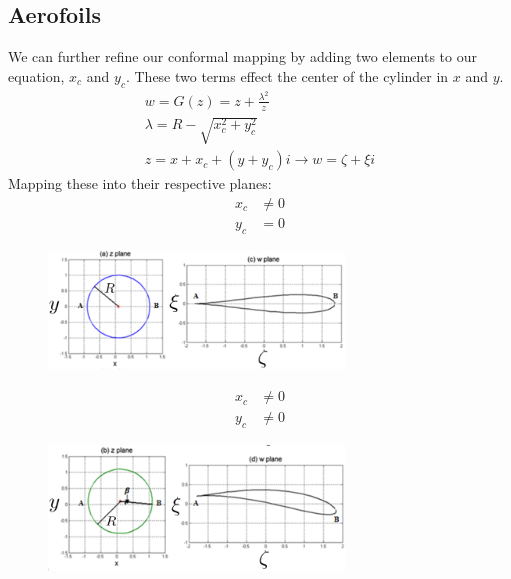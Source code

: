 \documentclass[class=report, crop=false, 12pt,a4paper]{standalone}
\begin{document}
\subsection{Aerofoils}
We can further refine our conformal mapping by adding two elements to our equation, $x_c$ and $y_c$. These two terms effect the center of the cylinder in $x$ and $y$. 
\begin{gather}
  w = G(z) = z + \frac{\lambda^2}{z}\\
  \lambda = R - \sqrt{x_c^2 + y_c^2}\\
  z = x + x_c + (y + y_c)i \rightarrow w = \zeta + \xi i
\end{gather}
Mapping these into their respective planes:
\begin{align}
  x_c &\neq 0\\
  y_c &= 0
\end{align}
\begin{figure}[H]
  \centering
  \includegraphics[width = 0.7\textwidth]{../img/diagram35.png}
\end{figure}
\begin{align}
  x_c &\neq 0\\
  y_c &\neq 0 
\end{align}
\begin{figure}[H]
  \centering
  \includegraphics[width = 0.7\textwidth]{../img/diagram36.png}
\end{figure}
\end{document}
